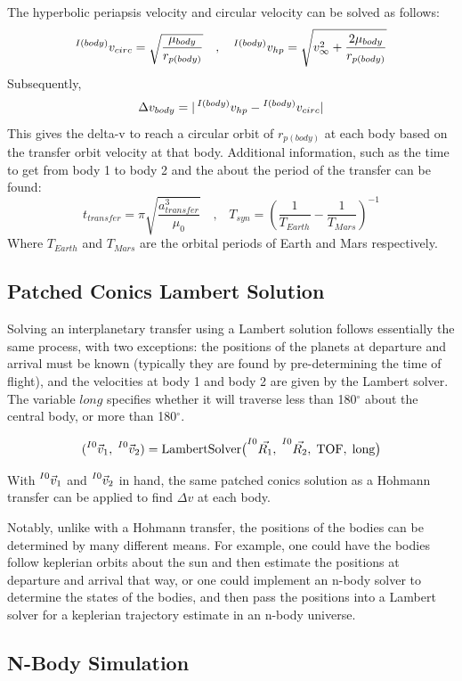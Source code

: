 \documentclass[conference]{IEEEtran}
\begin{document}
	The hyperbolic periapsis velocity and circular velocity can be solved as follows:
	\[
	\prescript{I(body)}{}{v_{circ}} = \sqrt{\frac{\mu_{body}}{r_{p(body)}}}
	\quad\text{,}\quad
	\prescript{I(body)}{}{v_{hp}} = \sqrt{v_{\infty}^2 + \frac{2\mu_{body}}{r_{p(body)}}}
	\]
	Subsequently,
	\[
	\Delta v_{body} = |\prescript{I(body)}{}{v_{hp}} - \prescript{I(body)}{}{v_{circ}}|
	\]
	This gives the delta-v to reach a circular orbit of $r_{p(body)}$ at each body based on the transfer orbit velocity at that body. Additional information, such as the time to get from body 1 to body 2 and the about the period of the transfer can be found:
	\[
	t_{transfer} = \pi \sqrt{\frac{a_{transfer}^3}{\mu_0}}
	\quad\text{,}\quad
	T_{syn} = (\frac{1}{T_{Earth}} - \frac{1}{T_{Mars}})^{-1}
	\]
	Where $T_{Earth}$ and $T_{Mars}$ are the orbital periods of Earth and Mars respectively.
	
	\subsection{Patched Conics Lambert Solution}
	Solving an interplanetary transfer using a Lambert solution follows essentially the same process, with two exceptions: the positions of the planets at departure and arrival must be known (typically they are found by pre-determining the time of flight), and the velocities at body 1 and body 2 are given by the Lambert solver. The variable $long$ specifies whether it will traverse  less than 180$^\circ$ about the central body, or more than 180$^\circ$.
	
	\[
	(\prescript{I0}{}{\vec{v}_1},\;\prescript{I0}{}{\vec{v}_2})
	= \mathrm{LambertSolver}\bigl(\prescript{I0}{}{\vec{R_1}},\;\prescript{I0}{}{\vec{R_2}},\;\mathrm{TOF},\;\mathrm{long}\bigr)
	\]
	
	With $\prescript{I0}{}{\vec{v}_1}$ and $\prescript{I0}{}{\vec{v}_2}$ in hand, the same patched conics solution as a Hohmann transfer can be applied to find $\Delta v$ at each body.
	
	Notably, unlike with a Hohmann transfer, the positions of the bodies can be determined by many different means. For example, one could have the bodies follow keplerian orbits about the sun and then estimate the positions at departure and arrival that way, or one could implement an n-body solver to determine the states of the bodies, and then pass the positions into a Lambert solver for a keplerian trajectory estimate in an n-body universe.
	
	\subsection{N-Body Simulation}
	
\end{document}

